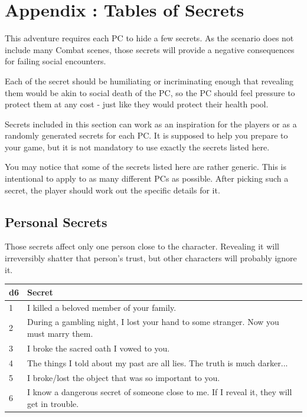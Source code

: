 \chapter{Appendix \thechapter{}: Tables of Secrets}
\label{chap:secretsTable}

This adventure requires each PC to hide a few secrets. As the scenario does not include many Combat scenes, those secrets will provide a negative consequences for failing social encounters.

Each of the secret should be humiliating or incriminating enough that revealing them would be akin to social death of the PC, so the PC should feel pressure to protect them at any cost - just like they would protect their health pool.

Secrets included in this section can work as an inspiration for the players or as a randomly generated secrets for each PC. It is supposed to help you prepare to your game, but it is not mandatory to use exactly the secrets listed here.

You may notice that some of the secrets listed here are rather generic. This is intentional to apply to as many different PCs as possible. After picking such a secret, the player should work out the specific details for it.

\section{Personal Secrets}

Those secrets affect only one person close to the character. Revealing it will irreversibly shatter that person's trust, but other characters will probably ignore it. \\

\noindent
\begin{tabular}{p{0.5cm} p{7cm}}
	\color{black} d6 & \color{black} Secret \\ \hline
	
	\color{black} 1 & \color{black} I killed a beloved member of your family. \\
	
	\color{black} 2 & \color{black} During a gambling night, I lost your hand to some stranger. Now you must marry them. \\
	
	\color{black} 3 & \color{black} I broke the sacred oath I vowed to you. \\
	
	\color{black} 4 & \color{black} The things I told about my past are all lies. The truth is much darker... \\
	
	\color{black} 5 & \color{black} I broke/lost the object that was so important to you. \\
	
	\color{black} 6 & \color{black} I know a dangerous secret of someone close to me. If I reveal it, they will get in trouble. \\
\end{tabular}




